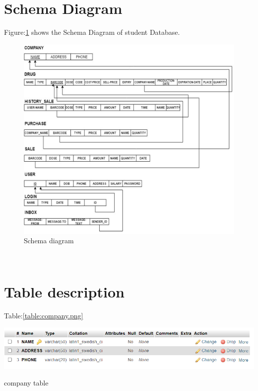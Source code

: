 \documentclass[12pt, letter paper]{report}
\begin{document}
\section{Schema Diagram} 
Figure:\ref{fig:DBMS-Schema.png} shows the Schema Diagram of student Database.
\begin{figure}[h]
 \centering
 \includegraphics[width=1\textwidth]{DBMS-Schema.png}
 \caption{Schema diagram}
 \label{fig:DBMS-Schema.png}
\end{figure}
\\
\pagebreak
\section{Table description} 
\begin{center}
Table:\ref{table:company.png} 
\begin{table}[h]
	\centering
	\includegraphics[width=1\textwidth]{company.png}
	\caption{company table}
	\label{table:company.png}
\end{table}
\end{center}
\end{document}
